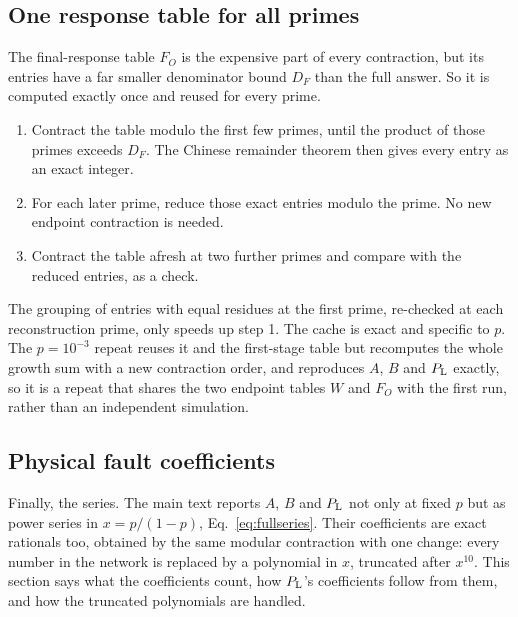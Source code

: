 \subsection{One response table for all primes}\label{app:F-reuse}
The final-response table $F_O$ is the expensive part of every contraction, but its entries have a far smaller denominator bound $D_F$ than the full answer. So it is computed exactly once and reused for every prime.
\begin{enumerate}
\item Contract the table modulo the first few primes, until the product of those primes exceeds $D_F$. The Chinese remainder theorem then gives every entry as an exact integer.
\item For each later prime, reduce those exact entries modulo the prime. No new endpoint contraction is needed.
\item Contract the table afresh at two further primes and compare with the reduced entries, as a check.
\end{enumerate}
The grouping of entries with equal residues at the first prime, re-checked at each reconstruction prime, only speeds up step 1. The cache is exact and specific to $p$. The $p=10^{-3}$ repeat reuses it and the first-stage table but recomputes the whole growth sum with a new contraction order, and reproduces $A$, $B$ and $P_{\mathrm L}$ exactly, so it is a repeat that shares the two endpoint tables $W$ and $F_O$ with the first run, rather than an independent simulation.

\subsection{Physical fault coefficients}\label{app:F-series}
Finally, the series. The main text reports $A$, $B$ and $P_{\mathrm L}$ not only at fixed $p$ but as power series in $x=p/(1-p)$, Eq.~\eqref{eq:fullseries}. Their coefficients are exact rationals too, obtained by the same modular contraction with one change: every number in the network is replaced by a polynomial in $x$, truncated after $x^{10}$. This section says what the coefficients count, how $P_{\mathrm L}$'s coefficients follow from them, and how the truncated polynomials are handled.

